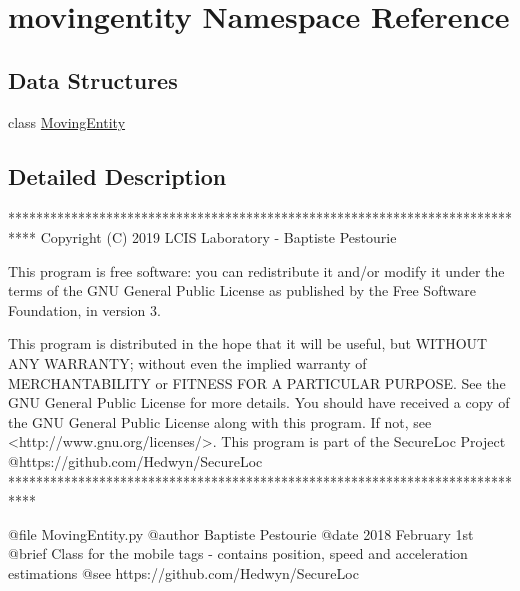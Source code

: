 \hypertarget{namespacemovingentity}{}\section{movingentity Namespace Reference}
\label{namespacemovingentity}
\subsection*{Data Structures}
\begin{DoxyCompactItemize}
\item 
class \mbox{\hyperlink{classmovingentity_1_1_moving_entity}{Moving\+Entity}}
\end{DoxyCompactItemize}


\subsection{Detailed Description}
\begin{DoxyVerb}****************************************************************************
Copyright (C) 2019 LCIS Laboratory - Baptiste Pestourie

This program is free software: you can redistribute it and/or modify
it under the terms of the GNU General Public License as published by
the Free Software Foundation, in version 3.

This program is distributed in the hope that it will be useful,
but WITHOUT ANY WARRANTY; without even the implied warranty of
MERCHANTABILITY or FITNESS FOR A PARTICULAR PURPOSE. See the
GNU General Public License for more details.
You should have received a copy of the GNU General Public License
along with this program. If not, see <http://www.gnu.org/licenses/>.
This program is part of the SecureLoc Project @https://github.com/Hedwyn/SecureLoc
 ****************************************************************************

@file MovingEntity.py
@author Baptiste Pestourie
@date 2018 February 1st
@brief Class for the mobile tags - contains position, speed and acceleration estimations
@see https://github.com/Hedwyn/SecureLoc
\end{DoxyVerb}
 